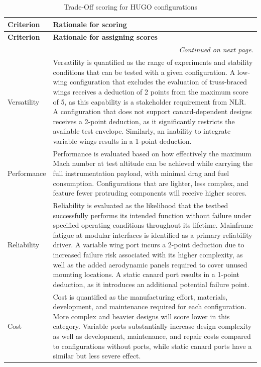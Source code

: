 \begin{longtable}{|p{2.5cm}|p{13.5cm}|}
\caption{Trade-Off scoring for HUGO configurations}
\label{tab:trade-off_scoring} \\

\hline
\textbf{Criterion} & \textbf{Rationale for scoring} \\ 
\hline
\endfirsthead

\hline
\textbf{Criterion} & \textbf{Rationale for assigning scores} \\ 
\hline
\endhead

\hline
\multicolumn{2}{r}{\textit{Continued on next page.}} \\
\endfoot

\hline
\endlastfoot

Versatility & Versatility is quantified as the range of experiments and stability conditions that can be tested with a given configuration. A low-wing configuration that excludes the evaluation of truss-braced wings receives a deduction of 2 points from the maximum score of 5, as this capability is a stakeholder requirement from NLR. A configuration that does not support canard-dependent designs receives a 2-point deduction, as it significantly restricts the available test envelope. Similarly, an inability to integrate variable wings results in a 1-point deduction. \\ \hline

Performance & Performance is evaluated based on how effectively the maximum Mach number at test altitude can be achieved while carrying the full instrumentation payload, with minimal drag and fuel consumption. Configurations that are lighter, less complex, and feature fewer protruding components will receive higher scores. \\ \hline

Reliability & Reliability is evaluated as the likelihood that the testbed successfully performs its intended function without failure under specified operating conditions throughout its lifetime. Mainframe fatigue at modular interfaces is identified as a primary reliability driver. A variable wing port incurs a 2-point deduction due to increased failure risk associated with its higher complexity, as well as the added aerodynamic panels required to cover unused mounting locations. A static canard port results in a 1-point deduction, as it introduces an additional potential failure point. \\ \hline

Cost & Cost is quantified as the manufacturing effort, materials, development, and maintenance required for each configuration. More complex and heavier designs will score lower in this category. Variable ports substantially increase design complexity as well as development, maintenance, and repair costs compared to configurations without ports, while static canard ports have a similar but less severe effect. \\ \hline


\end{longtable}
